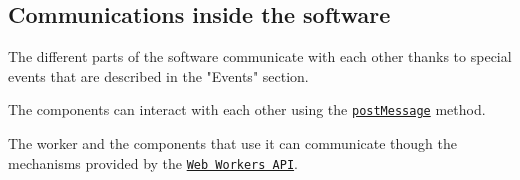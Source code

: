 \subsection{Communications inside the software}
The different parts of the software communicate with each other thanks to special events that are described in the "Events" section.

\noindent The components can interact with each other using the \texttt{\href{https://developer.mozilla.org/fr/docs/Web/API/Window/postMessage}{postMessage}} method.

\noindent The worker and the components that use it can communicate though the mechanisms provided by the 
\texttt{\href{https://developer.mozilla.org/fr/docs/Web/API/Web_Workers_API/Using_web_workers}{Web Workers API}}.